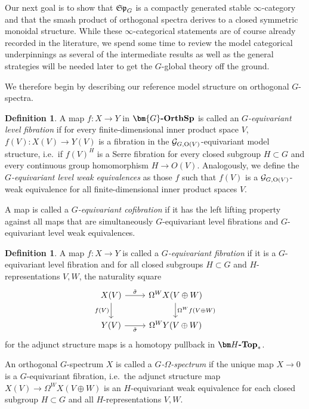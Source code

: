 \documentclass[reqno]{memo-l}
\theoremstyle{mythm}
\theoremstyle{definition}
\newtheorem{definition}[thm]{Definition}
\numberwithin{equation}{section}
\newcommand{\cat}[1]{\textbf{\textup{#1}}}
\renewcommand{\O}{{\textup{O}}}
\newcommand{\mySp}{{\mathfrak S\kern-.5pt\mathfrak p}}
\newcommand{\Gosp}[1]{\cat{$\bm{#1}$-OrthSp}}
\begin{document}
Our next goal is to show that $\mySp_G$ is a compactly generated stable $\infty$-category and that the smash product of orthogonal spectra derives to a closed symmetric monoidal structure. While these $\infty$-categorical statements are of course already recorded in the literature, we spend some time to review the model categorical underpinnings as several of the intermediate results as well as the general strategies will be needed later  to get the $G$-global theory off the ground.

We therefore begin by describing our reference model structure on orthogonal $G$-spectra.

\begin{definition}\label{def:level}
    A map $f\colon X\to Y$ in $\Gosp{G}$ is called an \emph{$G$-equivariant level fibration} if for every finite-dimensional inner product space $V$, $f(V)\colon X(V)\to Y(V)$ is a fibration in the $\mathcal G_{G,\O(V)}$-equivariant model structure, i.e.~if $f(V)^H$ is a Serre fibration for every closed subgroup $H\subset G$ and every continuous group homomorphism $H\to O(V)$. Analogously, we define the \emph{$G$-equivariant level weak equivalences} as those $f$ such that $f(V)$ is a $\mathcal G_{G,\O(V)}$-weak equivalence for all finite-dimensional inner product spaces $V$. 

    A map is called a \emph{$G$-equivariant cofibration} if it has the left lifting property against all maps that are simultaneously $G$-equivariant level fibrations and $G$-equivariant level weak equivalences.
\end{definition}

\begin{definition}
    A map $f\colon X\to Y$ is called a \emph{$G$-equivariant fibration} if it is a $G$-equivariant level fibration and for all closed subgroups $H\subset G$ and $H$-representations $V,W$, the naturality square
    \[
        \begin{tikzcd}
            X(V)\arrow[r,"\tilde\sigma"]\arrow[d,"f(V)"'] & \Omega^WX(V\oplus W)\arrow[d,"\Omega^Wf(V\oplus W)"]\\
            Y(V)\arrow[r,"\tilde\sigma"'] & \Omega^WY(V\oplus W)
        \end{tikzcd}
    \]
    for the adjunct structure maps is a homotopy pullback in $\cat{$\bm H$-Top}_*$.

    An orthogonal $G$-spectrum $X$ is called a \emph{$G$-$\Omega$-spectrum} if the unique map $X\to 0$ is a $G$-equivariant fibration, i.e.\ the adjunct structure map $X(V)\to \Omega^WX(V\oplus W)$ is an $H$-equivariant weak equivalence for each closed subgroup $H\subset G$ and all $H$-representations $V,W$.
\end{definition}
\end{document}
